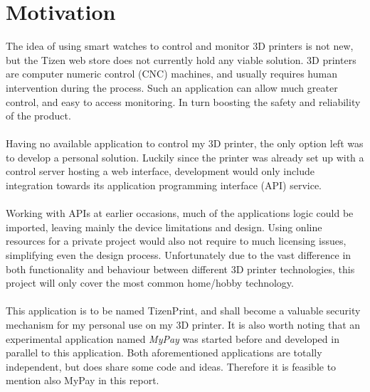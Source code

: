 \documentclass[a4paper, 12pt]{article}
\newcommand{\mysection}[1]{\section*{#1} \addcontentsline{toc}{section}{#1}}
\begin{document}
    \mysection{Motivation}
    The idea of using smart watches to control and monitor 3D printers is not new, but the Tizen web store does not
    currently hold any viable solution.
    3D printers are computer numeric control (CNC) machines, and usually requires human intervention during the
    process.
    Such an application can allow much greater control, and easy to access monitoring.
    In turn boosting the safety and reliability of the product.
    \\\\
    Having no available application to control my 3D printer, the only option left was to develop a personal
    solution.
    Luckily since the printer was already set up with a control server hosting a web interface, development would only
    include integration towards its application programming interface (API) service.
    \\\\
    Working with APIs at earlier occasions, much of the applications logic could be imported, leaving mainly the
    device limitations and design.
    Using online resources for a private project would also not require to much licensing issues, simplifying even the
    design process.
    Unfortunately due to the vast difference in both functionality and behaviour between different 3D printer
    technologies, this project will only cover the most common home/hobby technology.
    \\\\
    This application is to be named TizenPrint, and shall become a valuable security mechanism for my personal use
    on my 3D printer.
    It is also worth noting that an experimental application named \textit{MyPay} was started before and developed
    in parallel to this application.
    Both aforementioned applications are totally independent, but does share some code and ideas.
    Therefore it is feasible to mention also MyPay in this report.

    \newpage
\end{document}
